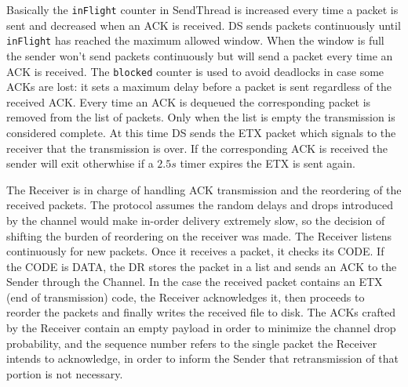 \documentclass[10pt,twocolumn]{article}
\begin{document}
Basically the \texttt{inFlight} counter in SendThread is increased every time
a packet is sent and decreased when an ACK is received. DS sends packets
continuously until \texttt{inFlight} has reached the maximum allowed window.
When the window is full the sender won't send packets continuously but will
send a packet every time an ACK is received. The \texttt{blocked} counter is
used to avoid deadlocks in case some ACKs are lost: it sets a maximum delay 
before a packet is sent regardless of the received ACK.
Every time an ACK is dequeued the corresponding packet is removed from the
list of packets. Only when the list is empty the transmission is considered
complete. At this time DS sends the ETX packet which signals to the receiver 
that the transmission is over. If the corresponding ACK is received the sender
will exit otherwhise if a $2.5s$ timer expires the ETX is sent again.

The Receiver is in charge of handling ACK transmission and the reordering of the received packets. The protocol assumes the random delays and drops introduced by the channel would make in-order delivery extremely slow, so the decision of shifting the burden of reordering on the receiver was made. The Receiver listens continuously for new packets. Once it receives a packet, it checks its CODE. If the CODE is DATA, the DR stores the packet in a list and sends an ACK to the Sender through the Channel. In the case the received packet contains an ETX (end of transmission) code, the Receiver acknowledges it, then proceeds to reorder the packets and finally writes the received file to disk. The ACKs crafted by the Receiver contain an empty payload in order to minimize the channel drop probability, and the sequence number refers to the single packet the Receiver intends to acknowledge, in order to inform the Sender that retransmission of that portion is not necessary.
\end{document}

